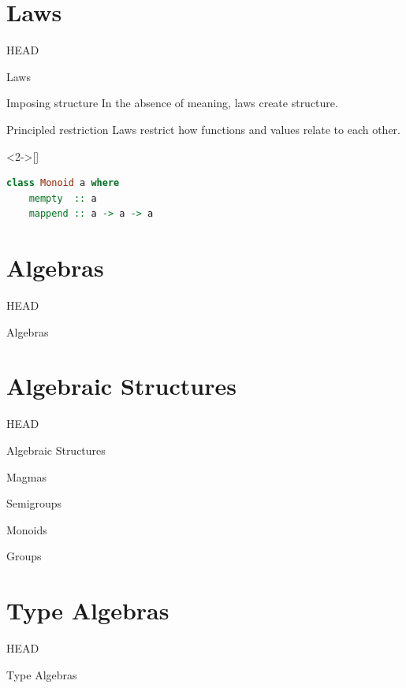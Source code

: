\documentclass[utf8x,notes,17pt]{beamer}
\newcommand{\head}[1]{\begin{center}
\vspace{13mm}\hspace{-1mm}\Huge{{#1}}
\end{center}}
\begin{document}
\section{Laws}
\label{sec-4}
\begin{frame}[fragile,plain,label=sec-4-1]{HEAD}
\head{Laws}
\end{frame}
\begin{frame}[fragile,label=sec-4-2]{Imposing structure}
In the absence of meaning, laws create structure.
\end{frame}
\begin{frame}[fragile,label=sec-4-3]{Principled restriction}
Laws restrict how functions and values relate to each other.
\begin{example}<2->[\vspace*{-3.5ex}]%
\begin{lstlisting}[language=Haskell]
class Monoid a where
    mempty  :: a
    mappend :: a -> a -> a
\end{lstlisting}
\end{example}
\end{frame}
\section{Algebras}
\label{sec-5}
\begin{frame}[fragile,plain,label=sec-5-1]{HEAD}
\head{Algebras}
\end{frame}
\section{Algebraic Structures}
\label{sec-6}
\begin{frame}[fragile,plain,label=sec-6-1]{HEAD}
\head{Algebraic Structures}
\end{frame}
\begin{frame}[fragile,label=sec-6-2]{Magmas}
\end{frame}
\begin{frame}[fragile,label=sec-6-3]{Semigroups}
\end{frame}
\begin{frame}[fragile,label=sec-6-4]{Monoids}
\end{frame}
\begin{frame}[fragile,label=sec-6-5]{Groups}
\end{frame}
\section{Type Algebras}
\label{sec-7}
\begin{frame}[fragile,plain,label=sec-7-1]{HEAD}
\head{Type Algebras}
\end{frame}
\end{document}
